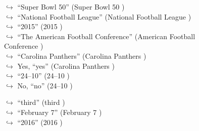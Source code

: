 \documentclass[11pt,a4paper, onecolumn]{article}
\begin{document}
\begin{figure}[t] \small \begin{tcolorbox}[boxsep=0pt,left=5pt,right=0pt,top=2pt,colback = yellow!5] \begin{dialogue}
 \small 
\colorbox{pink!25}{$\hookrightarrow$}
{ ``Super Bowl 50'' (Super Bowl 50 ) }
\\
\colorbox{pink!25}{$\hookrightarrow$}
{ ``National Football League'' (National Football League ) }
\\
\colorbox{pink!25}{$\hookrightarrow$}
{ ``2015'' (2015 ) }
\\
\colorbox{pink!25}{$\hookrightarrow$}
{ ``The American Football Conference'' (American Football Conference ) }
\\
\colorbox{pink!25}{$\hookrightarrow$}
{ ``Carolina Panthers'' (Carolina Panthers ) }
\\
\colorbox{pink!25}{$\hookrightarrow$}
\colorbox{red!25}{Yes,}
{ ``yes'' (Carolina Panthers ) }
\\
\colorbox{pink!25}{$\hookrightarrow$}
{ ``24–10'' (24–10 ) }
\\
\colorbox{pink!25}{$\hookrightarrow$}
\colorbox{red!25}{No,}
{ ``no'' (24–10 ) }
 \end{dialogue}\end{tcolorbox}\end{figure}\begin{figure}[t] \small \begin{tcolorbox}[boxsep=0pt,left=5pt,right=0pt,top=2pt,colback = yellow!5] \begin{dialogue}
 \small 
\colorbox{pink!25}{$\hookrightarrow$}
{ ``third'' (third ) }
\\
\colorbox{pink!25}{$\hookrightarrow$}
{ ``February 7'' (February 7 ) }
\\
\colorbox{pink!25}{$\hookrightarrow$}
{ ``2016'' (2016 ) }
\\

\end{dialogue}
\end{tcolorbox}
\end{figure}
\end{document}

